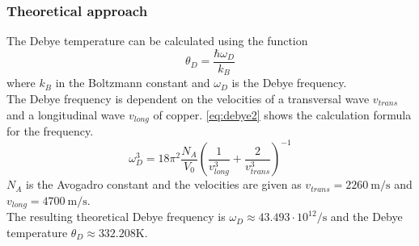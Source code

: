 \subsubsection{Theoretical approach}
The Debye temperature can be calculated using the function
\begin{equation}
    \theta_D = \frac{\hbar\omega_D}{k_B}
    \label{eq:debye1}
\end{equation}
where $k_B$ in the Boltzmann constant and  $\omega_D$ is the Debye frequency.\\
The Debye frequency is dependent on the velocities of a transversal wave $v_{trans}$ and a longitudinal wave $v_{long}$ of copper.
\autoref{eq:debye2} shows the calculation formula for the frequency.
\begin{equation}
    \omega_D^3 = 18\pi^2 \frac{N_A}{V_0}\left(\frac{1}{v^3_{long}}+\frac{2}{v^3_{trans}}\right)^{-1}
    \label{eq:debye2}
\end{equation}
$N_A$ is the Avogadro constant and the velocities are given as $v_{trans} = \SI{2260}{\metre\per\second}$ and $v_{long} = \SI{4700}{\metre\per\second}$\cite{V47}.\\
\newline
The resulting theoretical Debye frequency is $\omega_D \approx 43.493\cdot 10^{12}\si{\per\second}$ and the Debye temperature $\theta_D \approx 332.208\si{\kelvin}$.